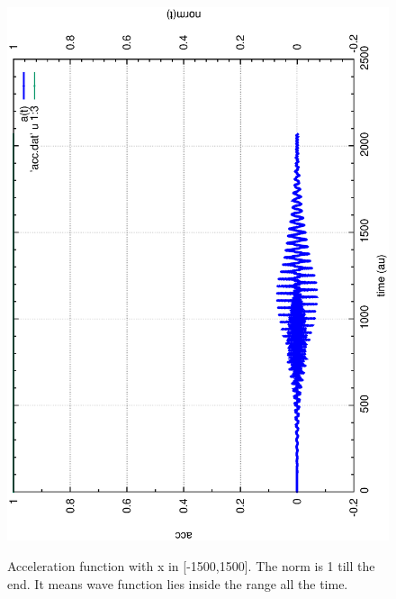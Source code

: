\documentclass{isildur}
\begin{document}
\begin{itemize}
\begin{figure}[htbp]
{{{\includegraphics[width=\linewidth]{fig2a.eps}} }}
\caption{Acceleration function with x in [-1500,1500]. The norm is 1 till the end. It means wave function lies inside the range all the time.
 }
\end{figure}
\begin{figure}[htbp]
\centering
\mbox{}
\end{figure}
\end{itemize}
\end{document}
